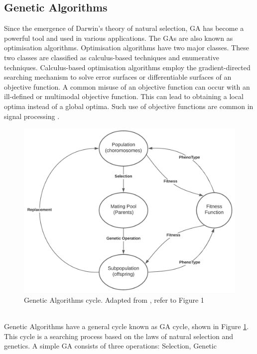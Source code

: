 \documentclass[a4paper, 11pt]{article}
\begin{document}
    \subsection{Genetic Algorithms}\label{sec:bg_sub2}
    Since the emergence of Darwin's theory of natural selection, GA has become a powerful tool and used in various
    applications.  The GAs are also known as optimisation algorithms. Optimisation algorithms have two major classes.
    These two classes are classified as calculus-based techniques and enumerative techniques. Calculus-based
    optimisation algorithms employ the gradient-directed searching mechanism to solve error surfaces or differentiable
    surfaces of an objective function. A common misuse of an objective function can occur with an ill-defined or multimodal
    objective function. This can lead to obtaining a local optima instead of a global optima. Such use of objective
    functions are common in signal processing \cite{Tang1996}.
    \\
    \begin{figure}[h!]
        \centering
        \graphicspath{{./wiki/}}
        \includegraphics[scale=0.7]{GA_cycle.png}
        \caption{Genetic Algorithms cycle. Adapted from \cite{Tang1996}, refer to Figure 1}
        \label{Fig:GA_cycle}
    \end{figure}
    \\
    Genetic Algorithms have a general cycle known as GA cycle, shown in Figure \ref{Fig:GA_cycle}. This cycle is a searching
    process  based on the laws of natural selection and genetics. A simple GA consists of three operations: Selection, Genetic
\end{document}
